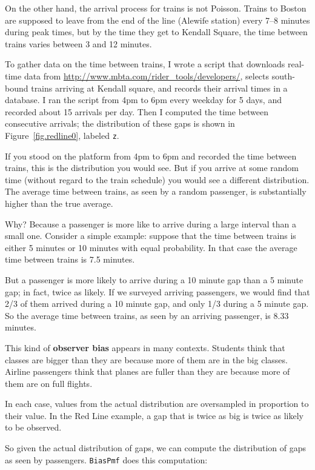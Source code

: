 \documentclass[12pt]{book}
\theoremstyle{exercise}
\begin{document}
On the other hand, the arrival process for trains is not Poisson.
Trains to Boston are supposed to leave from the end of the line
(Alewife station) every 7--8 minutes during peak times, but by the time
they get to Kendall Square, the time between trains varies between 3
and 12 minutes.

To gather data on the time between trains, I wrote a script that
downloads real-time data from
\url{http://www.mbta.com/rider_tools/developers/}, selects south-bound
trains arriving at Kendall square, and records their arrival times
in a database.  I ran the script from 4pm to 6pm every weekday
for 5 days, and recorded about 15 arrivals per day.  Then
I computed the time between consecutive arrivals; the distribution
of these gaps is shown in Figure~\ref{fig.redline0}, labeled {\tt z}.

If you stood on the platform from 4pm to 6pm and recorded the time
between trains, this is the distribution you would see.  But if you
arrive at some random time (without regard to the train schedule) you
would see a different distribution.  The average time
between trains, as seen by a random passenger, is substantially
higher than the true average.

Why?  Because a passenger is more like to arrive during a
large interval than a small one.  Consider a simple example:
suppose that the time between trains is either 5 minutes
or 10 minutes with equal probability.  In that case
the average time between
trains is 7.5 minutes.

But a passenger is more likely to arrive during a 10 minute gap 
than a 5 minute gap; in fact, twice as likely.  If we surveyed
arriving passengers, we would find that 2/3 of them arrived during
a 10 minute gap, and only 1/3 during a 5 minute gap.  So the
average time between trains, as seen by an arriving passenger,
is 8.33 minutes.

This kind of {\bf observer bias} appears in many contexts.  Students
think that classes are bigger than they are because more of them are
in the big classes.  Airline passengers think that planes are fuller
than they are because more of them are on full flights.

In each case, values from the actual distribution are
oversampled in proportion to their value.  In the Red Line example,
a gap that is twice as big is twice as likely to be observed.

So given the actual distribution of gaps, we can compute the
distribution of gaps as seen by passengers.  {\tt BiasPmf}
does this computation:
\end{document}
